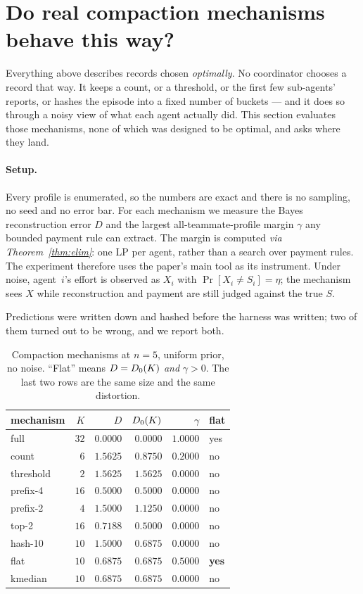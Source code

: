 \section{Do real compaction mechanisms behave this way?}
\label{sec:experiment}

Everything above describes records chosen \emph{optimally}. No coordinator
chooses a record that way. It keeps a count, or a threshold, or the first few
sub-agents' reports, or hashes the episode into a fixed number of buckets --- and
it does so through a noisy view of what each agent actually did. This section
evaluates those mechanisms, none of which was designed to be optimal, and asks
where they land.

\paragraph{Setup.}
Every profile is enumerated, so the numbers are exact and there is no sampling,
no seed and no error bar. For each mechanism we measure the Bayes reconstruction
error $D$ and the largest all-teammate-profile margin $\gamma$ any bounded
payment rule can extract. The margin is computed \emph{via
Theorem~\ref{thm:elim}}: one LP per agent, rather than a search over payment
rules. The experiment therefore uses the paper's main tool as its instrument.
Under noise, agent~$i$'s effort is observed as $X_i$ with
$\Pr[X_i \ne S_i] = \eta$; the mechanism sees $X$ while reconstruction and
payment are still judged against the true $S$.

Predictions were written down and hashed before the harness was written; two of
them turned out to be wrong, and we report both.

\begin{table}[t]
\centering
\caption{Compaction mechanisms at $n = 5$, uniform prior, no noise. ``Flat''
means $D = D_0(K)$ \emph{and} $\gamma > 0$. The last two rows are the same
size and the same distortion.}
\label{tab:mechanisms}
\small
\begin{tabular}{@{}lrrrrl@{}}
\toprule
mechanism & $K$ & $D$ & $D_0(K)$ & $\gamma$ & flat \\
\midrule
full        & $32$ & $0.0000$ & $0.0000$ & $1.0000$ & yes \\
count       & $6$  & $1.5625$ & $0.8750$ & $0.2000$ & no \\
threshold   & $2$  & $1.5625$ & $1.5625$ & $0.0000$ & no \\
prefix-4    & $16$ & $0.5000$ & $0.5000$ & $0.0000$ & no \\
prefix-2    & $4$  & $1.5000$ & $1.1250$ & $0.0000$ & no \\
top-2       & $16$ & $0.7188$ & $0.5000$ & $0.0000$ & no \\
hash-10     & $10$ & $1.5000$ & $0.6875$ & $0.0000$ & no \\
\midrule
flat        & $10$ & $0.6875$ & $0.6875$ & $0.5000$ & \textbf{yes} \\
kmedian     & $10$ & $0.6875$ & $0.6875$ & $0.0000$ & no \\
\bottomrule
\end{tabular}
\end{table}

